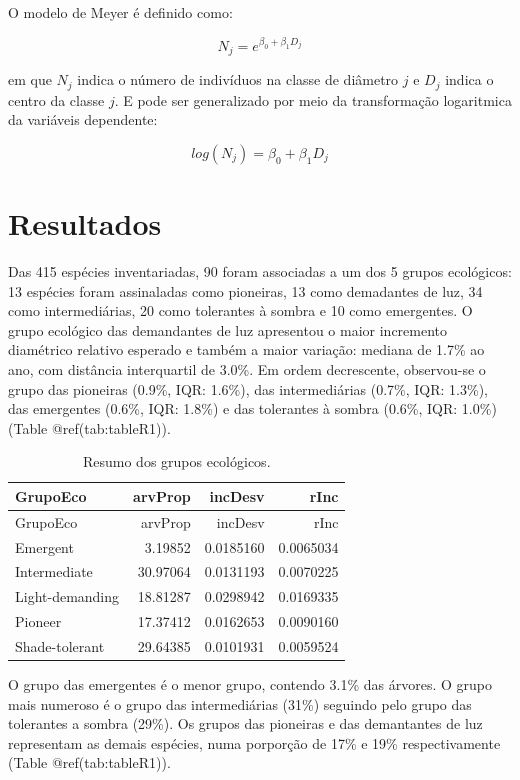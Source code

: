 \documentclass[
]{article}
\begin{document}
O modelo de Meyer é definido como:

\[N_j = e^{\beta_0 + \beta_1 D_j}\]

em que \(N_j\) indica o número de indivíduos na classe de diâmetro \(j\)
e \(D_j\) indica o centro da classe \(j\). E pode ser generalizado por
meio da transformação logaritmica da variáveis dependente:

\[log(N_j) = \beta_0 + \beta_1 D_j\]

\hypertarget{resultados}{%
\section{Resultados}\label{resultados}}

Das 415 espécies inventariadas, 90 foram associadas a um dos 5 grupos
ecológicos: 13 espécies foram assinaladas como pioneiras, 13 como
demadantes de luz, 34 como intermediárias, 20 como tolerantes à sombra e
10 como emergentes. O grupo ecológico das demandantes de luz apresentou
o maior incremento diamétrico relativo esperado e também a maior
variação: mediana de 1.7\% ao ano, com distância interquartil de 3.0\%.
Em ordem decrescente, observou-se o grupo das pioneiras (0.9\%, IQR:
1.6\%), das intermediárias (0.7\%, IQR: 1.3\%), das emergentes (0.6\%,
IQR: 1.8\%) e das tolerantes à sombra (0.6\%, IQR: 1.0\%) (Table
@ref(tab:tableR1)).

\begin{longtable}[]{@{}lrrr@{}}
\caption{Resumo dos grupos ecológicos.}\tabularnewline
\toprule()
GrupoEco & arvProp & incDesv & rInc \\
\midrule()
\endfirsthead
\toprule()
GrupoEco & arvProp & incDesv & rInc \\
\midrule()
\endhead
Emergent & 3.19852 & 0.0185160 & 0.0065034 \\
Intermediate & 30.97064 & 0.0131193 & 0.0070225 \\
Light-demanding & 18.81287 & 0.0298942 & 0.0169335 \\
Pioneer & 17.37412 & 0.0162653 & 0.0090160 \\
Shade-tolerant & 29.64385 & 0.0101931 & 0.0059524 \\
\bottomrule()
\end{longtable}

O grupo das emergentes é o menor grupo, contendo 3.1\% das árvores. O
grupo mais numeroso é o grupo das intermediárias (31\%) seguindo pelo
grupo das tolerantes a sombra (29\%). Os grupos das pioneiras e das
demantantes de luz representam as demais espécies, numa porporção de
17\% e 19\% respectivamente (Table @ref(tab:tableR1)).
\end{document}
